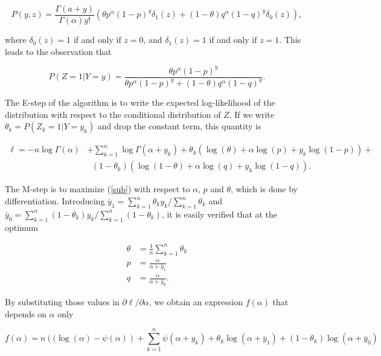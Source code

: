 \documentclass[12pt]{article}
\begin{document}
\begin{appendices}
    \begin{equation*}
    P(y, z) = \frac{\Gamma(a+y)}{\Gamma(\alpha)y!}
    \left(\theta p^{\alpha}(1-p)^y \delta_1(z) + (1-\theta)
    q^{\alpha}(1-q)^y \delta_0(z)\right),
    \end{equation*}

    \noindent
    where $\delta_0(z) = 1$ if and only if $z = 0$, and
    $\delta_1(z) = 1$ if and only if $z = 1$. This leads to the
    observation that

    \begin{equation}
    P(Z=1 | Y=y) = \frac{\theta p^{\alpha}(1-p)^y}
      {\theta p^{\alpha}(1-p)^y + (1-\theta) q^{\alpha}(1-q)^y}.
    \end{equation}

    The E-step of the algorithm is to write the expected log-likelihood
    of the distribution with respect to the conditional distribution
    of $Z$. If we write $\theta_k = P(Z_k=1 | Y=y_k)$ and drop the
    constant term, this quantity is

    \begin{align}
    \ell = -n \log \Gamma(\alpha) &+ \sum_{k=1}^n
      \log \Gamma(\alpha + y_k) + \nonumber
    \theta_k (\log(\theta) + \alpha \log(p) +
    y_k \log(1-p)) + \nonumber \\
    &\;\; (1-\theta_k) (\log(1-\theta) + \alpha \log(q) +
    y_k \log(1-q)).
\label{sub}
    \end{align}

    The M-step is to maximize (\ref{sub}) with respect to
    $\alpha$, $p$ and $\theta$, which is done by
    differentiation. Introducing
    $\bar{y}_1 = \sum_{k=1}^n \theta_k y_k / \sum_{k=1}^n \theta_k$
    and $\bar{y}_0 = \sum_{k=1}^n (1-\theta_k) y_k /
    \sum_{k=1}^n (1-\theta_k)$, it is easily verified that at
    the optimum

    \begin{align*}
    \theta &= \frac{1}{n}\sum_{k=1}^n\theta_k \\
    p &= \frac{\alpha} {\alpha+\bar{y}_1} \\
    q &= \frac{\alpha} {\alpha+\bar{y}_0}.
    \end{align*}

    By substituting those values in $\partial \ell / \partial \alpha$,
    we obtain an expression $f(\alpha)$ that depends on $\alpha$ only

    \begin{equation*}
       f(\alpha) = n \left( (\log(\alpha) - \psi(\alpha) \right) +
      \sum_{k=1}^n \psi(\alpha+y_k) + \theta_k \log(\alpha + \bar{y}_1)
      + (1-\theta_k) \log(\alpha + \bar{y}_0)
    \end{equation*}


\end{appendices}
\end{document}
